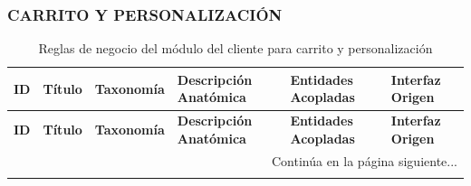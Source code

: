 \begin{landscape}
\subsubsection{CARRITO Y PERSONALIZACIÓN}
\begingroup
\setlength{\LTleft}{\fill}
\setlength{\LTright}{\fill}

\begin{longtable}[c]{l p{2.1cm} p{2.1cm} p{8cm} p{4cm} p{3cm}}
\caption{Reglas de negocio del módulo del cliente para carrito y personalización} \label{tab:reglas-negocio-cliente-carrito-personalizacion}\\
\toprule
\textbf{ID} & \textbf{Título} & \textbf{Taxonomía} & \textbf{Descripción Anatómica} & \textbf{Entidades Acopladas} & \textbf{Interfaz Origen} \\
\midrule
\endfirsthead

\toprule
\textbf{ID} & \textbf{Título} & \textbf{Taxonomía} & \textbf{Descripción Anatómica} & \textbf{Entidades Acopladas} & \textbf{Interfaz Origen} \\
\midrule
\endhead

\midrule
\multicolumn{6}{r}{\small Continúa en la página siguiente...} \\
\endfoot
\bottomrule
\endlastfoot


\end{longtable}
\end{landscape}
